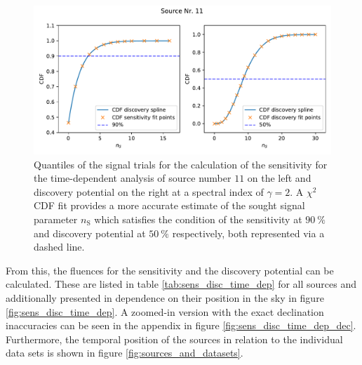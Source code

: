 \begin{figure}
    \centering
    \includegraphics[width=\linewidth]{Plots/05_csky/9_years_gfu_gold_time_dep_cdf_1.pdf}
    \caption{Quantiles of the signal trials for the calculation of the sensitivity for the time-dependent analysis of source number $\num{11}$ on the left and discovery potential on the right at a spectral index of $\gamma=\num{2}$. A $\chi^2$ CDF fit provides a more accurate estimate of the sought signal parameter $n_\text{S}$ which satisfies the condition of the sensitivity at $\SI{90}{\percent}$ and discovery potential at $\SI{50}{\percent}$ respectively, both represented via a dashed line.}
    \label{fig:time_dep_cdf_sens_disc_1}
\end{figure}
From this, the fluences for the sensitivity and the discovery potential can be calculated. These are listed in table \ref{tab:sens_disc_time_dep} for all sources and additionally presented in dependence on their position in the sky in figure \ref{fig:sens_disc_time_dep}.
A zoomed-in version with the exact declination inaccuracies can be seen in the appendix in figure \ref{fig:sens_disc_time_dep_dec}.
Furthermore, the temporal position of the sources in relation to the individual data sets is shown in figure \ref{fig:sources_and_datasets}.
